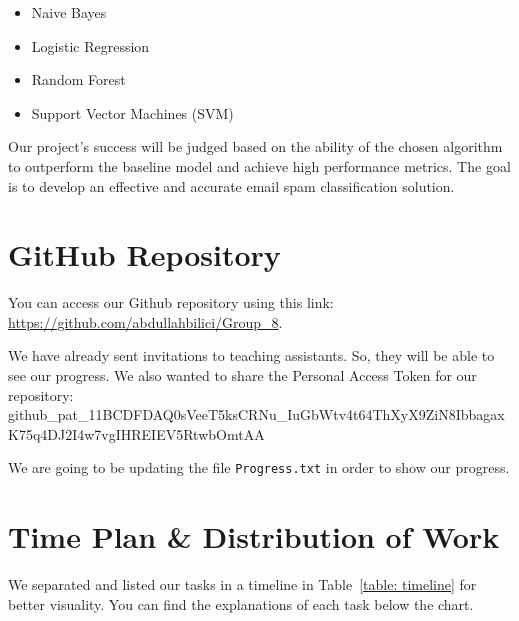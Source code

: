\documentclass[conference]{IEEEtran}
\begin{document}
\begin{itemize}
    \item Naive Bayes
    \item Logistic Regression
    \item Random Forest
    \item Support Vector Machines (SVM)
\end{itemize}

Our project's success will be judged based on the ability of the chosen algorithm to outperform the baseline model and achieve high performance metrics. The goal is to develop an effective and accurate email spam classification solution.

\section{GitHub Repository}
You can access our Github repository using this link: \href{https://github.com/abdullahbilici/Group\_8}{https://github.com/abdullahbilici/Group\_8}.

We have already sent invitations to teaching assistants. So, they will be able to see our progress. We also wanted to share the Personal Access Token for our repository: {\tiny github\_pat\_11BCDFDAQ0sVeeT5ksCRNu\_IuGbWtv4t64ThXyX9ZiN8IbbagaxK75q4DJ2I4w7vgIHREIEV5RtwbOmtAA}

We are going to be updating the file \verb|Progress.txt| in order to show our progress.

\section{Time Plan \& Distribution of Work}

We separated and listed our tasks in a timeline in Table \ref{table: timeline} for better visuality. You can find the explanations of each task below the chart.
\end{document}
